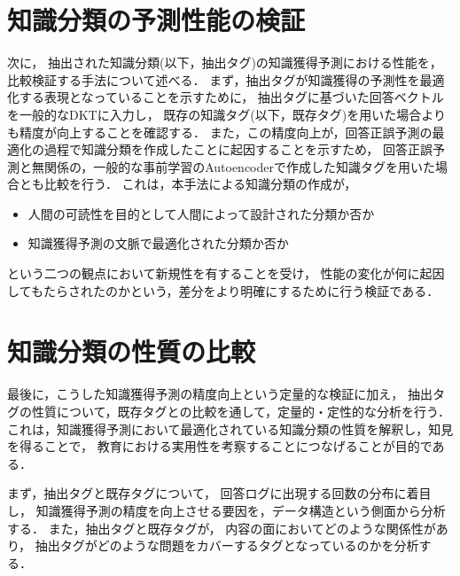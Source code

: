 \section{知識分類の予測性能の検証}
次に，
抽出された知識分類(以下，抽出タグ)の知識獲得予測における性能を，比較検証する手法について述べる．
まず，抽出タグが知識獲得の予測性を最適化する表現となっていることを示すために，
抽出タグに基づいた回答ベクトルを一般的なDKTに入力し，
既存の知識タグ(以下，既存タグ)を用いた場合よりも精度が向上することを確認する．
また，この精度向上が，回答正誤予測の最適化の過程で知識分類を作成したことに起因することを示すため，
回答正誤予測と無関係の，一般的な事前学習のAutoencoderで作成した知識タグを用いた場合とも比較を行う．
これは，本手法による知識分類の作成が，
\begin{itemize}
	\item 人間の可読性を目的として人間によって設計された分類か否か
	\item 知識獲得予測の文脈で最適化された分類か否か
\end{itemize}
という二つの観点において新規性を有することを受け，
性能の変化が何に起因してもたらされたのかという，差分をより明確にするために行う検証である．




\section{知識分類の性質の比較}
最後に，こうした知識獲得予測の精度向上という定量的な検証に加え，
抽出タグの性質について，既存タグとの比較を通して，定量的・定性的な分析を行う．
これは，知識獲得予測において最適化されている知識分類の性質を解釈し，知見を得ることで，
教育における実用性を考察することにつなげることが目的である．

まず，抽出タグと既存タグについて，
回答ログに出現する回数の分布に着目し，
知識獲得予測の精度を向上させる要因を，データ構造という側面から分析する．
また，抽出タグと既存タグが，
内容の面においてどのような関係性があり，
抽出タグがどのような問題をカバーするタグとなっているのかを分析する．

